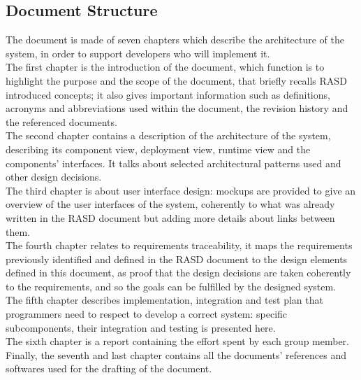 \subsection{Document Structure}
The document is made of seven chapters which describe the architecture of the system, in order to support developers who will implement it. \\
The first chapter is the introduction of the document, which function is to highlight the purpose and the scope of the document, that briefly recalls RASD introduced concepts; it also gives important information such as definitions, acronyms and abbreviations used within the document, the revision history and the referenced documents.\\
The second chapter contains a description of the architecture of the system, describing its component view, deployment view, runtime view and the components’ interfaces. It talks about selected architectural patterns used and other design decisions.\\
The third chapter is about user interface design: mockups are provided to give an overview of the user interfaces of the system, coherently to what was already written in the RASD document but adding more details about links between them.\\
The fourth chapter relates to requirements traceability, it maps the requirements previously identified and defined in the RASD document to the design elements defined in this document, as proof that the design decisions are taken coherently to the requirements, and so the goals can be fulfilled by the designed system.\\
The fifth chapter describes implementation, integration and test plan that programmers need to respect to develop a correct system: specific subcomponents, their integration and testing is presented here.\\
The sixth chapter is a report containing the effort spent by each group member.\\
Finally, the seventh and last chapter contains all the documents’ references and softwares used for the drafting of the document.